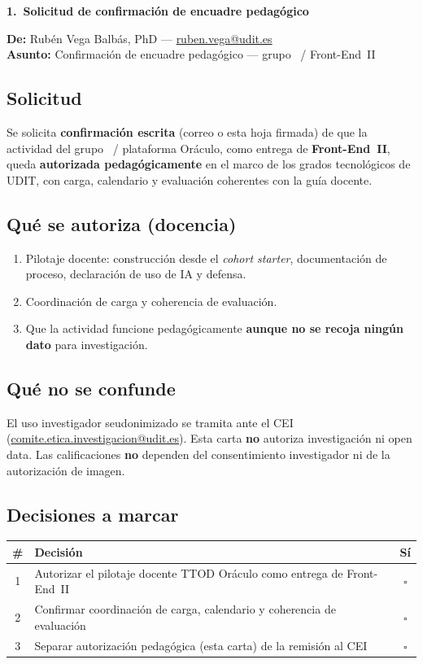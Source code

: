 \documentclass[11pt,a4paper]{scrartcl}
\newcommand{\AnnexTitle}[1]{%
  \clearpage
  \LogoRow
  \begin{center}{\Large\sffamily\bfseries #1}\end{center}
  \vspace{0.4em}
  \noindent{\color{rulegray}\hrule height 0.4pt}
  \vspace{0.5em}
}
\begin{document}
\AnnexTitle{1.\ Solicitud de confirmación de encuadre pedagógico}

\noindent\textbf{De:} Rubén Vega Balbás, PhD ---
\href{mailto:ruben.vega@udit.es}{ruben.vega@udit.es}\\
\textbf{Asunto:} Confirmación de encuadre pedagógico --- grupo \TTODfull\ / Front-End~II

\subsection*{Solicitud}
Se solicita \textbf{confirmación escrita} (correo o esta hoja firmada) de que la
actividad del grupo \TTODfull\ / plataforma Oráculo, como entrega de
\textbf{Front-End~II}, queda \textbf{autorizada pedagógicamente} en el marco de los
grados tecnológicos de UDIT, con carga, calendario y evaluación coherentes con la
guía docente.

\subsection*{Qué se autoriza (docencia)}
\begin{enumerate}
  \item Pilotaje docente: construcción desde el \emph{cohort starter}, documentación
        de proceso, declaración de uso de IA y defensa.
  \item Coordinación de carga y coherencia de evaluación.
  \item Que la actividad funcione pedagógicamente \textbf{aunque no se recoja ningún
        dato} para investigación.
\end{enumerate}

\subsection*{Qué no se confunde}
El uso investigador seudonimizado se tramita ante el CEI
(\href{mailto:comite.etica.investigacion@udit.es}{comite.etica.investigacion@udit.es}).
Esta carta \textbf{no} autoriza investigación ni open data. Las calificaciones
\textbf{no} dependen del consentimiento investigador ni de la autorización de imagen.

\subsection*{Decisiones a marcar}
\renewcommand{\arraystretch}{1.3}
\begin{tabularx}{\textwidth}{@{}c>{\raggedright\arraybackslash}X c@{}}
  \toprule
  \textbf{\#} & \textbf{Decisión} & \textbf{Sí} \\
  \midrule
  1 & Autorizar el pilotaje docente TTOD Oráculo como entrega de Front-End~II & $\square$ \\
  2 & Confirmar coordinación de carga, calendario y coherencia de evaluación & $\square$ \\
  3 & Separar autorización pedagógica (esta carta) de la remisión al CEI & $\square$ \\
  \bottomrule
\end{tabularx}
\end{document}
